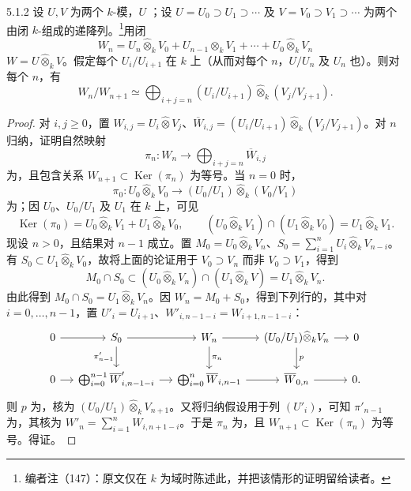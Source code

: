 \begin{SGAresult}{}{5.1.2}
设 $U,V$ 为两个 $k$-模，$U$ ；设 $U=U_0\supset U_1\supset\cdots$ 及 $V=V_0\supset V_1\supset\cdots$ 为两个由闭 $k$-组成的递降列。\footnote{编者注（147）：原文仅在 $k$ 为域时陈述此，并把该情形的证明留给读者。}用闭
\[
W_n=U_n\widehat\otimes_kV_0+U_{n-1}\widehat\otimes_kV_1+\cdots+U_0\widehat\otimes_kV_n
\]
 $W=U\widehat\otimes_kV$。假定每个 $U_i/U_{i+1}$ 在 $k$ 上（从而对每个 $n$，$U/U_n$ 及 $U_n$ 也）。则对每个 $n$，有
\[W_n/W_{n+1}\simeq\bigoplus_{i+j=n}(U_i/U_{i+1})\widehat\otimes_k(V_j/V_{j+1}).\]
\end{SGAresult}
\begin{proof}
对 $i,j\geq0$，置 $W_{i,j}=U_i\widehat\otimes V_j$、$\overline W_{i,j}=(U_i/U_{i+1})\widehat\otimes_k(V_j/V_{j+1})$。对 $n$ 归纳，证明自然映射
\[\pi_n:W_n\longrightarrow\bigoplus_{i+j=n}\overline W_{i,j}\]
为，且包含关系 $W_{n+1}\subset\operatorname{Ker}(\pi_n)$ 为等号。当 $n=0$ 时，
\[\pi_0:U_0\widehat\otimes_kV_0\longrightarrow(U_0/U_1)\widehat\otimes_k(V_0/V_1)\]
为；因 $U_0$、$U_0/U_1$ 及 $U_1$ 在 $k$ 上，可见
\[
\operatorname{Ker}(\pi_0)=U_0\widehat\otimes_kV_1+U_1\widehat\otimes_kV_0,\qquad
(U_0\widehat\otimes_kV_1)\cap(U_1\widehat\otimes_kV_0)=U_1\widehat\otimes_kV_1.
\]
现设 $n>0$，且结果对 $n-1$ 成立。置 $M_0=U_0\widehat\otimes_kV_n$、$S_0=\sum_{i=1}^nU_i\widehat\otimes_kV_{n-i}$。有 $S_0\subset U_1\widehat\otimes_kV_0$，故将上面的论证用于 $V_0\supset V_n$ 而非 $V_0\supset V_1$，得到
\[M_0\cap S_0\subset(U_0\widehat\otimes_kV_n)\cap(U_1\widehat\otimes_kV)=U_1\widehat\otimes_kV_n.\]
由此得到 $M_0\cap S_0=U_1\widehat\otimes_kV_n$。因 $W_n=M_0+S_0$，得到下列行的，其中对 $i=0,\ldots,n-1$，置 $U'_i=U_{i+1}$、$W'_{i,n-1-i}=W_{i+1,n-1-i}$：
\[
\begin{tikzcd}[column sep=small]
0\arrow[r]&S_0\arrow[r]\arrow[d,"\pi'_{n-1}"']&W_n\arrow[r]\arrow[d,"\pi_n"]&(U_0/U_1)\widehat\otimes_kV_n\arrow[r]\arrow[d,"p"]&0\\
0\arrow[r]&\bigoplus_{i=0}^{n-1}\overline W'_{i,n-1-i}\arrow[r]&\bigoplus_{i=0}^n\overline W_{i,n-1}\arrow[r]&\overline W_{0,n}\arrow[r]&0.
\end{tikzcd}
\]
则 $p$ 为，核为 $(U_0/U_1)\widehat\otimes_kV_{n+1}$。又将归纳假设用于列 $(U'_i)$，可知 $\pi'_{n-1}$ 为，其核为 $W'_n=\sum_{i=1}^nW_{i,n+1-i}$。于是 $\pi_n$ 为，且 $W_{n+1}\subset\operatorname{Ker}(\pi_n)$ 为等号。得证。
\end{proof}

